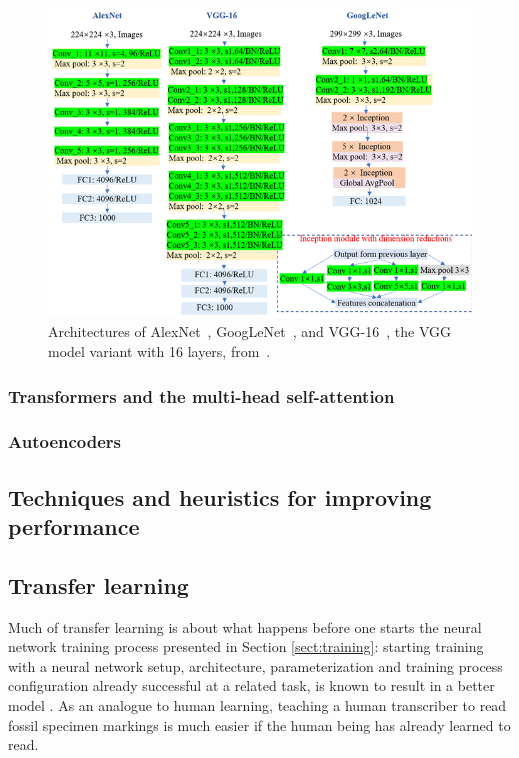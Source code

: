 \documentclass{article}
\begin{document}
\begin{figure}[h]
    \centering
    \includegraphics*[scale=0.6]{../images/famouscnns.png}
    \caption{Architectures of AlexNet~\cite{alexnet}, GoogLeNet~\cite{googlelenet}, and VGG-16~\cite{vgg}, the 
    VGG model variant with 16 layers, from~\cite{zhangImagebasedMethodsDietary2023}.}
    \label{image:famouscnns}
\end{figure}

\subsubsection{Transformers and the multi-head self-attention}

\subsubsection{Autoencoders}

\subsection{Techniques and heuristics for improving performance}
\label{sect:heuristics}

\subsection{Transfer learning}

Much of transfer learning is about what happens before one starts the neural network training process 
presented in Section \ref{sect:training}: starting training with a neural network setup, 
architecture, parameterization and training process configuration already successful at a related task,
is known to result in a better model \cite{transferlearning_survey}. As an analogue to human learning, teaching a human transcriber
to read fossil specimen markings is much easier if the human being has already learned to read.
\end{document}
